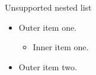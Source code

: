 \documentclass[14pt,t]{beamer}
\begin{document}
\begin{frame}{Unsupported nested list}
\begin{itemize}
\item Outer item one.
  \begin{itemize}
  \item Inner item one.
  \end{itemize}
\item Outer item two.
\end{itemize}
\end{frame}
\end{document}

